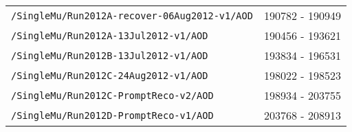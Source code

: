 \begin{table}[hbt]
\begin{center}
\begin{tabular}{lc}
\verb=/SingleMu/Run2012A-recover-06Aug2012-v1/AOD=                    &     190782 - 190949                  \\ 
\verb=/SingleMu/Run2012A-13Jul2012-v1/AOD=                                     &  190456 - 193621                     \\ 
\verb=/SingleMu/Run2012B-13Jul2012-v1/AOD=                                     &  193834 - 196531 \\ 
\verb=/SingleMu/Run2012C-24Aug2012-v1/AOD=                                   &   198022 - 198523                   \\ 
\verb=/SingleMu/Run2012C-PromptReco-v2/AOD=                                  &   198934 - 203755                    \\ 
\verb=/SingleMu/Run2012D-PromptReco-v1/AOD=                                  &  203768 - 208913   \\
 \hline\hline
\end{tabular}
\end{center}
\end{table}




\clearpage

